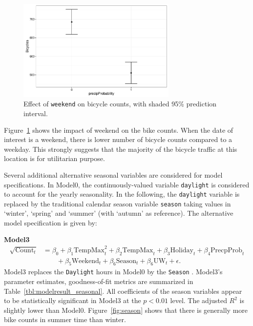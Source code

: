\documentclass [11pt, proquest] {uwthesis}[2015/03/03]
\begin{document}
\begin{figure}
\centering
  \includegraphics[width=0.7\textwidth]{figures/sim/Wknd}
  \caption{Effect of \texttt{weekend} on bicycle counts, with shaded 95\% prediction interval.}
  \label{fig:weekend}
\end{figure}

Figure~\ref{fig:weekend} shows the impact of weekend on the bike counts. When the date of interest is a weekend, there is lower number of bicycle counts compared to a weekday. This strongly suggests that the majority of the bicycle traffic at this location is for utilitarian purpose. 

Several additional alternative seasonal variables are considered for model specifications. In Model0,  the continuously-valued variable \texttt{daylight} is considered to account for the yearly seasonality. In the following, the \texttt{daylight} variable is replaced by the traditional calendar season variable \texttt{season} taking values in `winter', `spring' and `summer' (with `autumn' as reference). The alternative model specification is given by:

\textbf{Model3}
\begin{align}
\sqrt{\text{Count}_t} &= \beta_0 + \beta_1 \text{TempMax}^2_t + \beta_2 \text{TempMax}_t + \beta_3 \text{Holiday}_t + \beta_4 \text{PrecpProb}_t  \nonumber\\
&\qquad + \beta_5 \text{Weekend}_t + \beta_6 \text{Season}_t + \beta_6 \text{UW}_t + \epsilon.\label{eqref:model3}
\end{align}
Model3 replaces the \texttt{Daylight} hours in Model0 by the \texttt{Season} . Model3's parameter estimates, goodness-of-fit metrics are summarized in Table~\ref{tbl:modelresult_seasonal}. All coefficients of the season variables appear to be statistically significant in Model3 at the $p<0.01$ level. The adjusted $R^2$ is slightly lower than Model0. Figure~\ref{fig:season} shows that there is generally more bike counts in summer time than winter.
\end{document}
